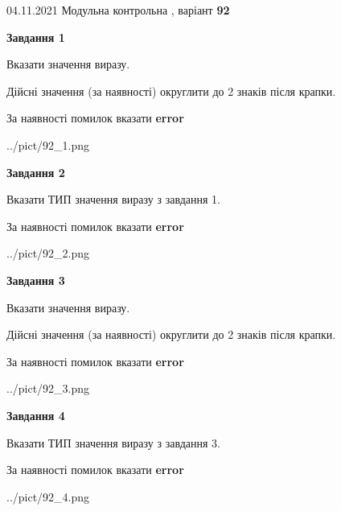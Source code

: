 \documentclass[11pt, ukrainian]{article}
\begin{document}
{04.11.2021 Модульна контрольна , варіант  \No \textbf { 92 }\par}
{
\begin {large}
{\begin {center}\textbf{Завдання 1}\end {center}}\par
Вказати значення виразу. \par
Дійсні значення (за наявності) округлити до 2 знаків після крапки. \par
За наявності помилок вказати \textbf{error}

\begin{center}
	{../pict/92_1.png}
\end{center}
\newpage

{\begin {center}\textbf{Завдання 2}\end {center}}\par
Вказати ТИП значення виразу з завдання 1. \par
За наявності помилок вказати \textbf{error}

\begin{center}
	{../pict/92_2.png}
\end{center}
\newpage

{\begin {center}\textbf{Завдання 3}\end {center}}\par
Вказати значення виразу. \par
Дійсні значення (за наявності) округлити до 2 знаків після крапки. \par
За наявності помилок вказати \textbf{error}

\begin{center}
	{../pict/92_3.png}
\end{center}
\newpage

{\begin {center}\textbf{Завдання 4}\end {center}}\par
Вказати ТИП значення виразу з завдання 3. \par
За наявності помилок вказати \textbf{error}

\begin{center}
	{../pict/92_4.png}
\end{center}
\newpage


\end{large}}
\end{document}
